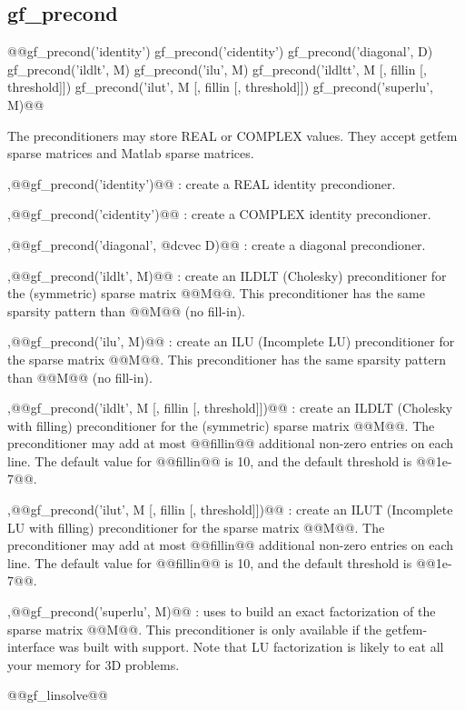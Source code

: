 \subsection{gf\_precond}
\begin{synopsis}
@@gf_precond('identity')
gf_precond('cidentity')
gf_precond('diagonal', \tvec D)
gf_precond('ildlt', \tspmat M)
gf_precond('ilu', \tspmat M)
gf_precond('ildltt', \tspmat M [, \tint fillin [, \tscal threshold]])
gf_precond('ilut', \tspmat M [, \tint fillin [, \tscal threshold]])
gf_precond('superlu', \tspmat M)@@\end{synopsis}
\begin{cmddescription}
  The preconditioners may store REAL or COMPLEX values. They accept
  getfem sparse matrices and Matlab sparse matrices.

  \sep{@@gf_precond('identity')@@} : create a REAL identity precondioner.

  \sep{@@gf_precond('cidentity')@@} : create a COMPLEX identity precondioner.

  \sep{@@gf_precond('diagonal', @dcvec D)@@} : create a diagonal precondioner.

  \sep{@@gf_precond('ildlt', M)@@} : create an ILDLT (Cholesky)
  preconditioner for the (symmetric) sparse matrix @@M@@. This
  preconditioner has the same sparsity pattern than @@M@@ (no
  fill-in).

  \sep{@@gf_precond('ilu', M)@@} : create an ILU (Incomplete LU) preconditioner for the sparse matrix @@M@@.
  This preconditioner has the same sparsity pattern than @@M@@ (no fill-in).

  \sep{@@gf_precond('ildlt', M [, fillin [, threshold]])@@} : create an ILDLT (Cholesky with filling) preconditioner for the (symmetric)
  sparse matrix @@M@@. The preconditioner may add at most @@fillin@@ additional non-zero entries on
  each line. The default value for @@fillin@@ is 10, and the default threshold is @@1e-7@@.

  \sep{@@gf_precond('ilut', M [, fillin [, threshold]])@@} : create an ILUT (Incomplete LU with filling) preconditioner for the sparse
  matrix @@M@@. The preconditioner may add at most @@fillin@@ additional non-zero entries on
  each line. The default value for @@fillin@@ is 10, and the default threshold is @@1e-7@@.

  \sep{@@gf_precond('superlu', \tspmat M)@@} : uses \SuperLU to build an exact factorization of the sparse matrix @@M@@.  This
  preconditioner is only available if the getfem-interface was built with
  \SuperLU support. Note that LU factorization is likely to eat all your memory
  for 3D problems.
\end{cmddescription}
\begin{gfseealso}
  @@gf\_linsolve@@
\end{gfseealso}
\newpage

